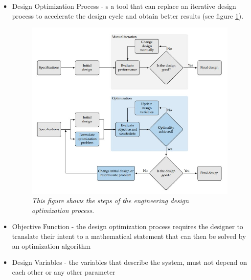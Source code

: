 \documentclass{journal}
\begin{document}
\begin{itemize}
		\item Design Optimization Process - s a tool that can replace an iterative design
		process to accelerate the design cycle and obtain better results (see figure \ref{fig:optimization}).
		
		\begin{figure}[H]
			\centering
			\includegraphics[scale=0.5]{../graphics/optimization_process}
			\caption{\emph{This figure shows the steps of the engineering design optimization process.}}
			\label{fig:optimization}
		\end{figure}
		
		\item Objective Function - the design optimization process requires the designer to translate their intent to a mathematical statement that can then be solved by an optimization algorithm
		\item Design Variables - the variables that describe the system, must not depend on each other or any other parameter
		
	\end{itemize}
	
\end{document}

